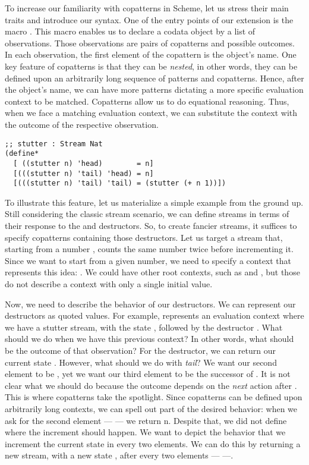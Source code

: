 To increase our familiarity with copatterns in Scheme, let us stress their main traits and introduce our syntax.
One of the entry points of our extension is the macro .
This macro enables us to declare a codata object by a list of observations.
Those observations are pairs of copatterns and possible outcomes.
In each observation, the first element of the copattern is the object's name.
One key feature of copatterns is that they can be \emph{nested}, in other words, they can be defined upon an arbitrarily long sequence of patterns and copatterns.
Hence, after the object's name, we can have more patterns dictating a more specific evaluation context to be matched.
Copatterns allow us to do equational reasoning. Thus, when we face a matching evaluation context, we can substitute the context with the outcome of the respective observation.

\begin{verbatim}
;; stutter : Stream Nat
(define*
  [ ((stutter n) 'head)        = n]
  [(((stutter n) 'tail) 'head) = n]
  [(((stutter n) 'tail) 'tail) = (stutter (+ n 1))])
\end{verbatim}

To illustrate this feature, let us materialize a simple example from the ground up.
Still considering the classic stream scenario, we can define streams in terms of their response to the  and  destructors. 
So, to create fancier streams, it suffices to specify copatterns containing those destructors.
Let us target a stream that, starting from a number , counts the same number twice before incrementing it. 
Since we want to start from a given number, we need to specify a context that represents this idea: .
We could have other root contexts, such as  and , but those do not describe a context with only a single initial value.

Now, we need to describe the behavior of our destructors.
We can represent our destructors as quoted values.
For example,  represents an evaluation context where we have a stutter stream, with the state , followed by the destructor .
What should we do when we have this previous context?
In other words, what should be the outcome of that observation? 
For the  destructor, we can return our current state .
However, what should we do with \emph{tail}? We want our second element to be , yet we want our third element to be the successor of .
It is not clear what we should do because the outcome depends on the \emph{next} action after . 
This is where copatterns take the spotlight.
Since copatterns can be defined upon arbitrarily long contexts, we can spell out part of the desired behavior: when we ask for the second element ---  --- we return n.
Despite that, we did not define where the increment should happen.
We want to depict the behavior that we increment the current state in every two elements. 
We can do this by returning a new stream, with a new state , after every two elements ---  ---. 

